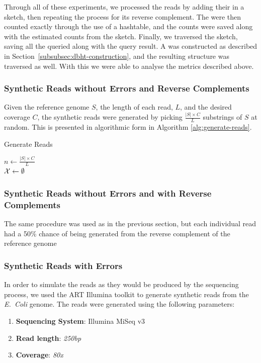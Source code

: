 Through all of these experiments, we processed the reads by adding their  in a \dBCM sketch, then repeating the process for its reverse complement. The  were then counted exactly through the use of a hashtable, and the counts were saved along with the estimated counts from the sketch. Finally, we traversed the sketch, saving all the queried  along with the query result. A \dBHT was constructed as described in Section~\ref{subsubsec:dbht-construction}, and the resulting structure was traversed as well. With this we were able to analyse the metrics described above.

\subsubsection{Synthetic Reads without Errors and Reverse Complements}

Given the reference genome $S$, the length of each read, $L$, and the desired coverage $C$, the synthetic reads were generated by picking
$\frac{|S| \times C}{L}$ substrings of $S$ at random. This is presented in algorithmic form in Algorithm \ref{alg:generate-reads}.

\begin{algorithm}
  \caption{Generate Reads}\label{alg:generate-reads}
  $n \gets \frac{|S| \times C}{L}$\\
  $\readset \gets \emptyset$\\
  \Return{$\readset$}
\end{algorithm}

\subsubsection{Synthetic Reads without Errors and with Reverse Complements}

The same procedure was used as in the previous section, but each individual read had a 50\% chance of being generated from the reverse complement of the reference genome 

\subsubsection{Synthetic Reads with Errors}

In order to simulate the reads as they would be produced by the sequencing process, we used the ART Illumina toolkit to generate
synthetic reads from the \emph{E.~Coli} genome. The reads were generated using the following parameters:

\begin{enumerate}
\item \textbf{Sequencing System}: Illumina MiSeq v3
\item \textbf{Read length}: \textit{250bp}
\item \textbf{Coverage}: \textit{80x}
\end{enumerate}